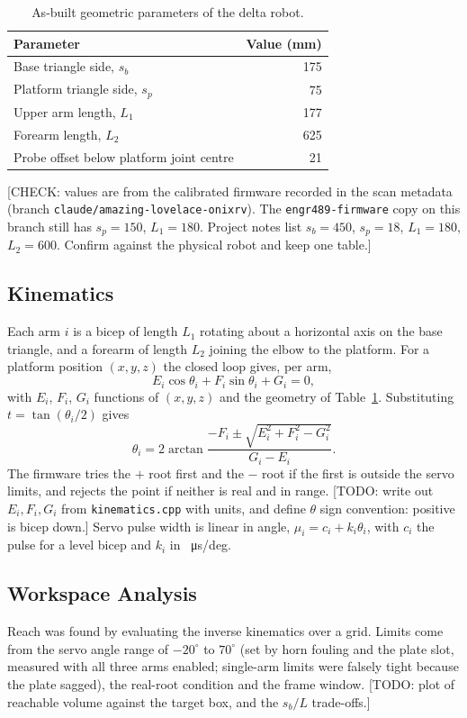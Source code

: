 \documentclass[conference]{IEEEtran}
\begin{document}
\begin{table}[t]
\caption{As-built geometric parameters of the delta robot.}
\label{tab:geom}
\centering\small
\begin{tabular}{lr}
\toprule
Parameter & Value (mm) \\
\midrule
Base triangle side, $s_b$ & 175 \\
Platform triangle side, $s_p$ & 75 \\
Upper arm length, $L_1$ & 177 \\
Forearm length, $L_2$ & 625 \\
Probe offset below platform joint centre & 21 \\
\bottomrule
\end{tabular}
\end{table}
[CHECK: values are from the calibrated firmware recorded in the scan metadata
(branch \texttt{claude/amazing-lovelace-onixrv}). The \texttt{engr489-firmware}
copy on this branch still has $s_p=150$, $L_1=180$. Project notes list $s_b=450$,
$s_p=18$, $L_1=180$, $L_2=600$. Confirm against the physical robot and keep one table.]

\subsection{Kinematics}
Each arm $i$ is a bicep of length $L_1$ rotating about a horizontal axis on the base
triangle, and a forearm of length $L_2$ joining the elbow to the platform. For a platform
position $(x,y,z)$ the closed loop gives, per arm,
\begin{equation}
E_i\cos\theta_i + F_i\sin\theta_i + G_i = 0,
\end{equation}
with $E_i$, $F_i$, $G_i$ functions of $(x,y,z)$ and the geometry of Table~\ref{tab:geom}.
Substituting $t=\tan(\theta_i/2)$ gives
\begin{equation}
\theta_i = 2\arctan\frac{-F_i\pm\sqrt{E_i^2+F_i^2-G_i^2}}{G_i-E_i}.
\end{equation}
The firmware tries the $+$ root first and the $-$ root if the first is outside the
servo limits, and rejects the point if neither is real and in range. [TODO: write
out $E_i,F_i,G_i$ from \texttt{kinematics.cpp} with units, and define $\theta$ sign
convention: positive is bicep down.] Servo pulse width is linear in angle,
$\mu_i = c_i + k_i\theta_i$, with $c_i$ the pulse for a level bicep and $k_i$ in
\SI{}{\micro s/deg}.

\subsection{Workspace Analysis}
Reach was found by evaluating the inverse kinematics over a grid. Limits come from
the servo angle range of $-20^\circ$ to $70^\circ$ (set by horn fouling and the plate
slot, measured with all three arms enabled; single-arm limits were falsely tight because
the plate sagged), the real-root condition and the frame window.
[TODO: plot of reachable volume against the target box, and the $s_b/L$ trade-offs.]
\end{document}

